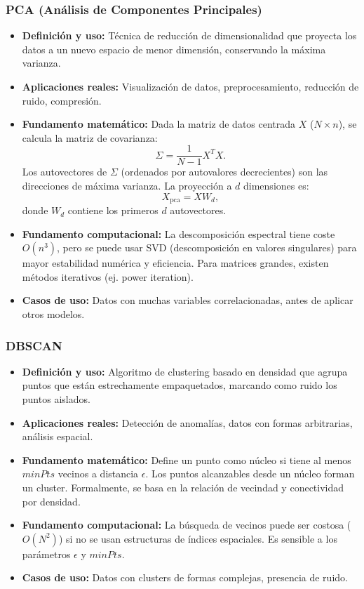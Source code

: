 \documentclass[12pt,a4paper,openany,oneside]{book}
\begin{document}
\subsubsection{PCA (Análisis de Componentes Principales)}
\begin{itemize}
    \item \textbf{Definición y uso:} Técnica de reducción de dimensionalidad que proyecta los datos a un nuevo espacio de menor dimensión, conservando la máxima varianza.
    \item \textbf{Aplicaciones reales:} Visualización de datos, preprocesamiento, reducción de ruido, compresión.
    \item \textbf{Fundamento matemático:} Dada la matriz de datos centrada \(X\) (\(N \times n\)), se calcula la matriz de covarianza:
    \[
    \Sigma = \frac{1}{N-1} X^T X.
    \]
    Los autovectores de \(\Sigma\) (ordenados por autovalores decrecientes) son las direcciones de máxima varianza. La proyección a \(d\) dimensiones es:
    \[
    X_{\text{pca}} = X W_d,
    \]
    donde \(W_d\) contiene los primeros \(d\) autovectores.
    \item \textbf{Fundamento computacional:} La descomposición espectral tiene coste \(O(n^3)\), pero se puede usar SVD (descomposición en valores singulares) para mayor estabilidad numérica y eficiencia. Para matrices grandes, existen métodos iterativos (ej. power iteration).
    \item \textbf{Casos de uso:} Datos con muchas variables correlacionadas, antes de aplicar otros modelos.
\end{itemize}

\subsubsection{DBSCAN}
\begin{itemize}
    \item \textbf{Definición y uso:} Algoritmo de clustering basado en densidad que agrupa puntos que están estrechamente empaquetados, marcando como ruido los puntos aislados.
    \item \textbf{Aplicaciones reales:} Detección de anomalías, datos con formas arbitrarias, análisis espacial.
    \item \textbf{Fundamento matemático:} Define un punto como núcleo si tiene al menos \(minPts\) vecinos a distancia \(\epsilon\). Los puntos alcanzables desde un núcleo forman un cluster. Formalmente, se basa en la relación de vecindad y conectividad por densidad.
    \item \textbf{Fundamento computacional:} La búsqueda de vecinos puede ser costosa (\(O(N^2)\)) si no se usan estructuras de índices espaciales. Es sensible a los parámetros \(\epsilon\) y \(minPts\).
    \item \textbf{Casos de uso:} Datos con clusters de formas complejas, presencia de ruido.
\end{itemize}
\end{document}
